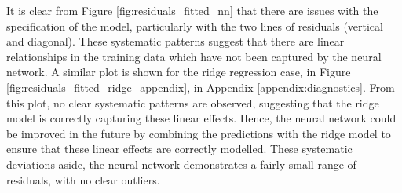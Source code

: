 \documentclass[11pt]{article}
\begin{document}
\noindent It is clear from Figure \ref{fig:residuals_fitted_nn} that there are issues with the specification of the model, particularly with the two lines of residuals (vertical and diagonal). These systematic patterns suggest that there are linear relationships in the training data which have not been captured by the neural network. A similar plot is shown for the ridge regression case, in Figure \ref{fig:residuals_fitted_ridge_appendix}, in Appendix \ref{appendix:diagnostics}. From this plot, no clear systematic patterns are observed, suggesting that the ridge model is correctly capturing these linear effects. Hence, the neural network could be improved in the future by combining the predictions with the ridge model to ensure that these linear effects are correctly modelled. These systematic deviations aside, the neural network demonstrates a fairly small range of residuals, with no clear outliers.



\end{document}
